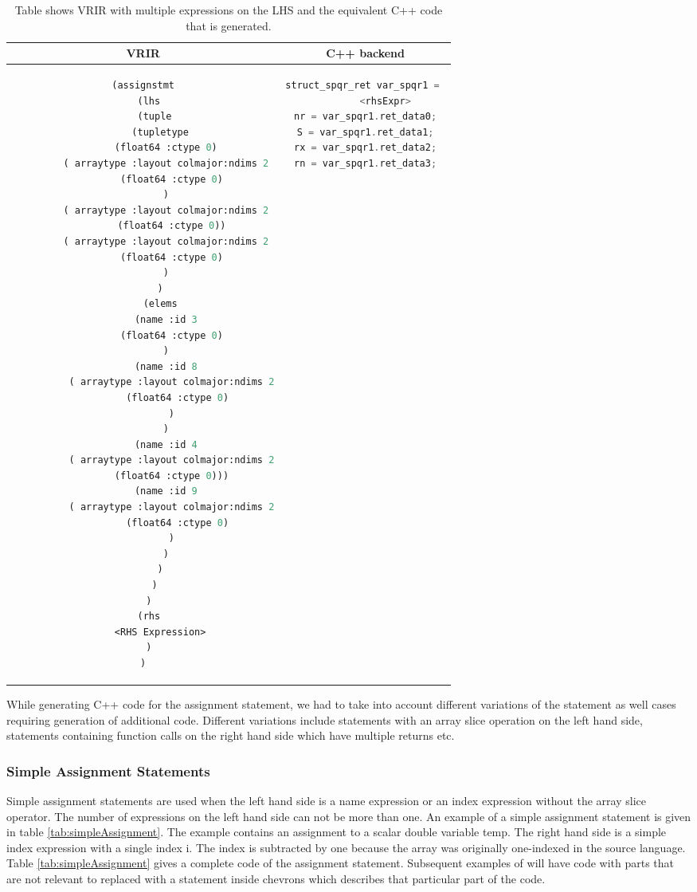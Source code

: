\begin{table}[htbp]
\begin{tabular}{|c|c|}
\hline 
VRIR & C++ backend \\
\hline 
{
\begin{lstlisting}[language=lisp, frame=none, numbers=none]
(assignstmt
  (lhs
    (tuple
      (tupletype
        (float64 :ctype 0)
        ( arraytype :layout colmajor:ndims 2
          (float64 :ctype 0)
        )
        ( arraytype :layout colmajor:ndims 2
          (float64 :ctype 0))
        ( arraytype :layout colmajor:ndims 2
          (float64 :ctype 0)
        )
      )
      (elems
        (name :id 3
          (float64 :ctype 0)
        )
        (name :id 8
          ( arraytype :layout colmajor:ndims 2
            (float64 :ctype 0)
          )
        )
        (name :id 4
          ( arraytype :layout colmajor:ndims 2
            (float64 :ctype 0)))  
        (name :id 9
          ( arraytype :layout colmajor:ndims 2
            (float64 :ctype 0)
          )
        )
      )
    )
  )
  (rhs
      <RHS Expression>
  )
)
\end{lstlisting}
} & 
{
\begin{lstlisting}[language=c,frame=none, numbers=none]
struct_spqr_ret var_spqr1 = 
		<rhsExpr> 
nr = var_spqr1.ret_data0;
S = var_spqr1.ret_data1;
rx = var_spqr1.ret_data2;
rn = var_spqr1.ret_data3;
\end{lstlisting}
} \\
\hline
\end{tabular}
\caption[Assignment with multiple LHS expressions]{Table shows VRIR with multiple expressions on the LHS and the equivalent C++ code that is generated.}
\label{tab:multAssignment}
\end{table}
While generating C++ code for the assignment statement, we had to take into account different variations of the statement as well cases requiring generation of additional code. Different variations include statements with an array slice operation on the left hand side, statements containing function calls on the right hand side which have multiple returns etc. 

\subsubsection{Simple Assignment Statements}
Simple assignment statements are used when the left hand side is a name expression or an index expression without the array slice operator. The number of expressions on the left hand side can not be more than one. An example of a simple assignment statement is given in table \ref{tab:simpleAssignment}. The example contains an assignment to a scalar double variable temp. The right hand side is a simple index expression with a single index i. The index is subtracted by one because the array was originally one-indexed in the source language. Table \ref{tab:simpleAssignment} gives a complete code of the assignment statement. Subsequent examples of will have code with parts that are not relevant to replaced with a statement inside chevrons which describes that particular part of the code.
